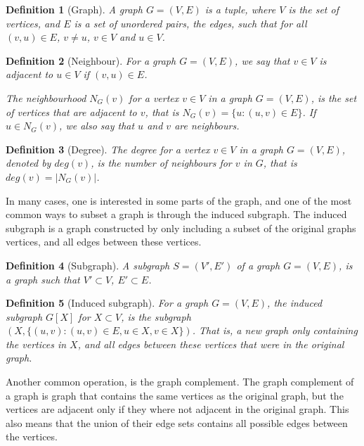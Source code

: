 \documentclass[a4paper]{article}
\newtheorem{definition}{Definition}[section]
\begin{document}
\begin{definition}[Graph]
    A graph $G = (V,E)$ is a tuple, where $V$ is the set of vertices, and $E$ is
    a set of unordered pairs, the edges, such that for all $(v,u) \in E$,
    $v \neq u$, $v \in V$ and $u \in V$.
\end{definition}
\begin{definition}[Neighbour]
    For a graph $G = (V,E)$, we say that $v \in V$ is adjacent to 
    $u \in V$ if $(v,u) \in E$. 

    The neighbourhood $N_G(v)$ for a vertex $v \in V$ in a graph $G = (V,E)$,
    is the set of vertices that are adjacent to $v$, that is 
    $N_G(v) = \{u : (u,v) \in E \}$. If $u \in N_G(v)$, we also say
    that $u$ and $v$ are neighbours.
\end{definition}
\begin{definition}[Degree]
    The degree for a vertex $v \in V$ in a graph $G = (V,E)$, denoted by 
    $deg(v)$, is the number of neighbours for $v$ in $G$, that is 
    $deg(v) = |N_G(v)|$.
\end{definition}

In many cases, one is interested in some parts of the graph, and one of the
most common ways to subset a graph is through the induced subgraph. The induced
subgraph is a graph constructed by only including a subset of the original
graphs vertices, and all edges between these vertices.

\begin{definition}[Subgraph]
    A subgraph $S = (V',E')$ of a graph $G = (V,E)$, is a graph such that
    $V' \subset V$, $E' \subset E$.
\end{definition}

\begin{definition}[Induced subgraph]
    
    For a graph $G = (V,E)$, the induced subgraph $G[X]$ for $X \subset V$, is
    the subgraph $(X,\{(u,v) : (u,v) \in E, u \in X,v \in X\})$. That
    is, a new graph only containing the vertices in $X$, and all edges between
    these vertices that were in the original graph.

\end{definition}

Another common operation, is the graph complement. The graph complement of a
graph is graph that contains the same vertices as the original graph, but the
vertices are adjacent only if they where not adjacent in the original graph.
This also means that the union of their edge sets contains all possible edges
between the vertices.
\end{document}
